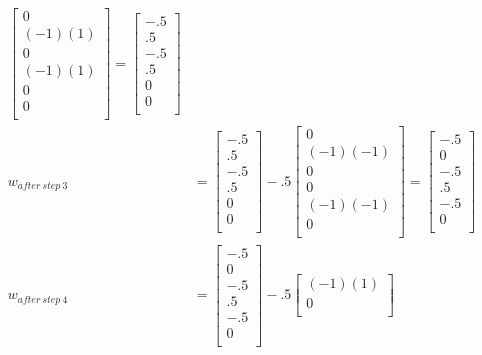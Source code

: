 \documentclass[10pt]{article}
\begin{document}
\begin{enumerate}[label=(\alph*)]
\begin{align*}
\begin{bmatrix}
  0\\
  (-1)(1)\\
  0\\
  (-1)(1)\\
  0\\
  0\\
  \end{bmatrix} = \begin{bmatrix}
  -.5\\
  .5\\
  -.5\\
  .5\\
  0\\
  0\\
  \end{bmatrix}\\
  w_{after\ step\ 3} &= \begin{bmatrix}
  -.5\\
  .5\\
  -.5\\
  .5\\
  0\\
  0\\
  \end{bmatrix} - .5 \begin{bmatrix}
  0\\
  (-1)(-1)\\
  0\\
  0\\
  (-1)(-1)\\
  0\\
  \end{bmatrix} = \begin{bmatrix}
  -.5\\
  0\\
  -.5\\
  .5\\
  -.5\\
  0\\
  \end{bmatrix}\\
  w_{after\ step\ 4} &= \begin{bmatrix}
  -.5\\
  0\\
  -.5\\
  .5\\
  -.5\\
  0\\
  \end{bmatrix} - .5 \begin{bmatrix}
  (-1)(1)\\
  0\\

\end{bmatrix}
\end{align*}
\end{enumerate}
\end{document}
